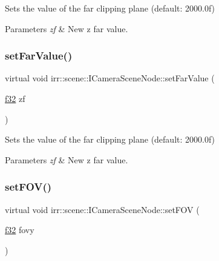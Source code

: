 Sets the value of the far clipping plane (default\+: 2000.\+0f) 


\begin{DoxyParams}{Parameters}
{\em zf} & New z far value. \\
\hline
\end{DoxyParams}
\mbox{\label{classirr_1_1scene_1_1ICameraSceneNode_ab7e427dd639b6bb63f648d6d087da1ea}} 
\subsubsection{\texorpdfstring{set\+Far\+Value()}{setFarValue()}\hspace{0.1cm}{\footnotesize\ttfamily [2/2]}}
{\footnotesize\ttfamily virtual void irr\+::scene\+::\+I\+Camera\+Scene\+Node\+::set\+Far\+Value (\begin{DoxyParamCaption}\item[{\hyperlink{namespaceirr_a0277be98d67dc26ff93b1a6a1d086b07}{f32}}]{zf }\end{DoxyParamCaption})\hspace{0.3cm}{\ttfamily [pure virtual]}}



Sets the value of the far clipping plane (default\+: 2000.\+0f) 


\begin{DoxyParams}{Parameters}
{\em zf} & New z far value. \\
\hline
\end{DoxyParams}
\mbox{\label{classirr_1_1scene_1_1ICameraSceneNode_a43ee11523e9cf842d4b5d8c6a572241c}} 
\subsubsection{\texorpdfstring{set\+F\+O\+V()}{setFOV()}\hspace{0.1cm}{\footnotesize\ttfamily [1/2]}}
{\footnotesize\ttfamily virtual void irr\+::scene\+::\+I\+Camera\+Scene\+Node\+::set\+F\+OV (\begin{DoxyParamCaption}\item[{\hyperlink{namespaceirr_a0277be98d67dc26ff93b1a6a1d086b07}{f32}}]{fovy }\end{DoxyParamCaption})\hspace{0.3cm}{\ttfamily [pure virtual]}}



